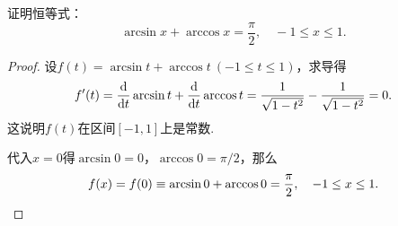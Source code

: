 \begin{example}
证明恒等式：\begin{equation*}
	\arcsin x + \arccos x = \frac{\pi}{2},
	\quad -1 \leq x \leq 1.
\end{equation*}
\begin{proof}
设\(f(t) = \arcsin t + \arccos t\ (-1 \leq t \leq 1)\)，求导得\begin{equation*}
	f'(t) = \dv{t} \arcsin t + \dv{t} \arccos t
	= \frac{1}{\sqrt{1-t^2}} - \frac{1}{\sqrt{1-t^2}} = 0.
\end{equation*}
这说明\(f(t)\)在区间\([-1,1]\)上是常数.

代入\(x=0\)得\(\arcsin 0 = 0\)，\(\arccos 0 = \pi/2\)，那么\begin{equation*}
	f(x) = f(0) \equiv \arcsin 0 + \arccos 0 = \frac{\pi}{2},
	\quad -1 \leq x \leq 1.
	\qedhere
\end{equation*}
\end{proof}
\end{example}

